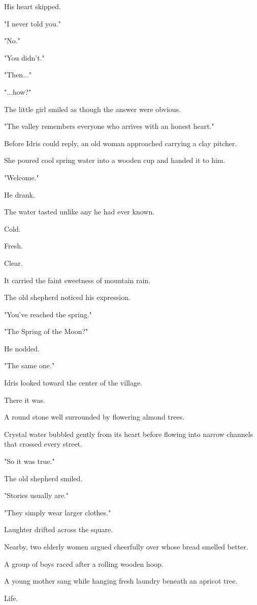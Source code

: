 \documentclass[12pt,openany]{book}
\begin{document}
His heart skipped.

"I never told you."

"No."

"You didn't."

"Then..."

"...how?"

The little girl smiled as though the answer were obvious.

"The valley remembers everyone who arrives with an honest heart."

Before Idris could reply, an old woman approached carrying a clay pitcher.

She poured cool spring water into a wooden cup and handed it to him.

"Welcome."

He drank.

The water tasted unlike any he had ever known.

Cold.

Fresh.

Clear.

It carried the faint sweetness of mountain rain.

The old shepherd noticed his expression.

"You've reached the spring."

"The Spring of the Moon?"

He nodded.

"The same one."

Idris looked toward the center of the village.

There it was.

A round stone well surrounded by flowering almond trees.

Crystal water bubbled gently from its heart before flowing into narrow channels that crossed every street.

"So it was true."

The old shepherd smiled.

"Stories usually are."

"They simply wear larger clothes."

Laughter drifted across the square.

Nearby, two elderly women argued cheerfully over whose bread smelled better.

A group of boys raced after a rolling wooden hoop.

A young mother sang while hanging fresh laundry beneath an apricot tree.

Life.
\end{document}
